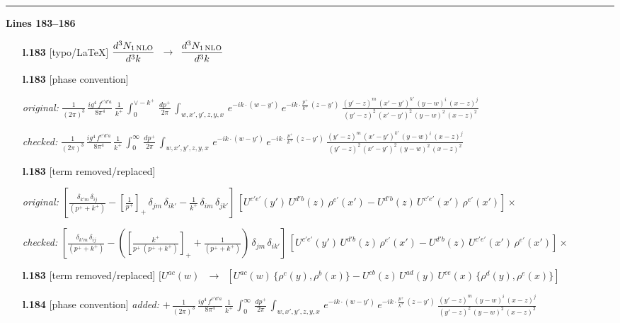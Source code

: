 \documentclass[10pt]{article}
\begin{document}
\noindent\rule{\linewidth}{0.3pt}\par\noindent\textbf{Lines 183--186} \par
\begin{itemize}[leftmargin=2.2em,itemsep=1pt,topsep=2pt]
\item[\textbf{l.183}] \textsf{\small [typo/LaTeX]} $\displaystyle \frac{d^{3}N_{1\,\rm NLO}}{d^{3}k}$\ $\longrightarrow$\ $\displaystyle \frac{d^{3}N_{1\,\rm NLO}}{d^{3}k}$
\item[\textbf{l.183}] \textsf{\small [phase convention]} \par\noindent\emph{original:} $\displaystyle \frac{1}{(2\pi)^{3}}\, \frac{ig^{4}\,f^{c'd'a}}{8\pi^{4}}\, \frac{1}{k^{+}}\,\int_{0}^{\vee-k^{+}}\, \frac{dp^{+}}{2\pi}\, \int_{w,x',y',z,y,x}\, e^{-ik\cdot (w-y')}\, e^{-ik\cdot \frac{p^{+}}{k^{+}}\,(z-y')}\,\frac{(y'-z)^{m}\,(x'-y')^{k'}\,(y-w)^{i}\,(x-z)^{j}}{(y'-z)^{2}\,(x'-y')^{2}\,(y-w)^{2}\,(x-z)^{2}}$\par\noindent\emph{checked:} $\displaystyle \frac{1}{(2\pi)^{3}}\, \frac{ig^{4}\,f^{c'd'a}}{8\pi^{4}}\, \frac{1}{k^{+}}\,\int_{0}^{\infty}\, \frac{dp^{+}}{2\pi}\, \int_{w,x',y',z,y,x}\, e^{-ik\cdot (w-y')}\, e^{-ik\cdot \frac{p^{+}}{k^{+}}\,(z-y')}\,\frac{(y'-z)^{m}\,(x'-y')^{k'}\,(y-w)^{i}\,(x-z)^{j}}{(y'-z)^{2}\,(x'-y')^{2}\,(y-w)^{2}\,(x-z)^{2}}$
\item[\textbf{l.183}] \textsf{\small [term removed/replaced]} \par\noindent\emph{original:} $\displaystyle [\frac{\delta_{k'm}\,\delta_{ij}}{(p^{+}+k^{+})}-[\frac{1}{p^{+}}]_{+}\,\delta_{jm}\,\delta_{ik'}-\frac{1}{k^{+}}\, \delta_{im}\, \delta_{jk'}]\, [U^{c'e'}(y')\,U^{d'b}(z)\,\rho^{e'}(x')-U^{d'b}(z)\,U^{c'e'}(x')\,\rho^{e'}(x')]\times$\par\noindent\emph{checked:} $\displaystyle [\frac{\delta_{k'm}\,\delta_{ij}}{(p^{+}+k^{+})}-([\frac{k^{+}}{p^{+}\,(p^{+}+k^{+})}]_{+}+\frac{1}{(p^{+}+k^{+})})\,\delta_{jm}\,\delta_{ik'}]\, [U^{c'e'}(y')\,U^{d'b}(z)\,\rho^{e'}(x')-U^{d'b}(z)\,U^{c'e'}(x')\,\rho^{e'}(x')]\times$
\item[\textbf{l.183}] \textsf{\small [term removed/replaced]} $\displaystyle [U^{ac}(w)\,$\ $\longrightarrow$\ $\displaystyle [U^{ac}(w)\, \{\rho^{c}(y),\rho^{b}(x)\}-U^{cb}(z)\,U^{ad}(y)\,U^{ce}(x)\,\{\rho^{d}(y),\rho^{e}(x)\}]$
\item[\textbf{l.184}] \textsf{\small [phase convention]} \emph{added:} $\displaystyle +\,\frac{1}{(2\pi)^{3}}\, \frac{ig^{4}\,f^{c'd'a}}{8\pi^{4}}\, \frac{1}{k^{+}}\,\int_{0}^{\infty}\, \frac{dp^{+}}{2\pi}\, \int_{w,x',y',z,y,x}\, e^{-ik\cdot (w-y')}\, e^{-ik\cdot \frac{p^{+}}{k^{+}}\,(z-y')}\,\frac{(y'-z)^{m}\,(y-w)^{i}\,(x-z)^{j}}{(y'-z)^{2}\,(y-w)^{2}\,(x-z)^{2}}$

\end{itemize}
\end{document}
